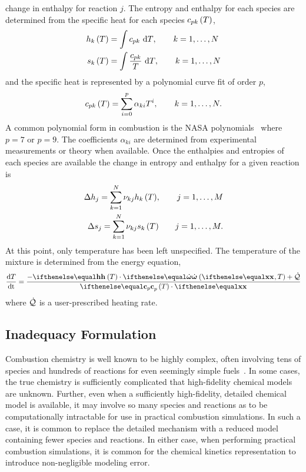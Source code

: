 \documentclass[fontsize=12pt, %
               paper=a4, %
               hyperref]{report}
\begin{document}
  change in enthalpy for reaction $j$.  The entropy and enthalpy 
  for each species are determined from the specific heat for each 
  species $c_{pk}\left(T\right)$,
  \begin{subequations}
    \begin{align}
      h_{k}\left(T\right) &= \int{c_{pk}\ \mathrm{d}T}, \qquad k = 1,\ldots,N \\
      s_{k}\left(T\right) &= \int{\frac{c_{pk}}{T}\ \mathrm{d}T}, \qquad k=1,\ldots,N
    \end{align}
  \end{subequations}
  and the specific heat is represented by a polynomial curve fit of 
  order $p$, 
  \begin{align}
    c_{pk}\left(T\right) = \sum_{i=0}^{p}{\alpha_{ki}T^{i}}, \qquad k = 1,\ldots,N.
  \end{align}
  A common polynomial form in combustion is the NASA
  polynomials~\cite{mcbride1993coefficients} where $p=7$ or $p=9$.  The coefficients 
  $\alpha_{ki}$ are determined from experimental measurements or theory when available.  
  Once the enthalpies and entropies of each species are available the change in entropy 
  and enthalpy for a given reaction is 
  \begin{subequations}
    \begin{align}
      \Delta h_{j} = \sum_{k=1}^{N}{\nu_{kj}h_{k}\left(T\right)}, \qquad j = 1,\ldots,M \\
      \Delta s_{j} = \sum_{k=1}^{N}{\nu_{kj}s_{k}\left(T\right)} \qquad j=1,\ldots,M.
    \end{align}
  \end{subequations} 
  At this point, only temperature has been left unspecified.  The temperature of 
  the mixture is determined from the energy equation,
  \begin{align}
    \odeone{T}{\time} = \dfrac{-\displaystyle\enth\lr{T}\cdot\rr\lr{\xc,T} + \heating}
                              {\displaystyle\cp\lr{T}\cdot\xc} 
    \label{eq:energy}
  \end{align}
  where $\dot{\mathcal{Q}}$ is a user-prescribed heating rate.

    
  \subsection{Inadequacy Formulation} \label{sec:inad1}
  Combustion chemistry is well known to be highly complex, often
  involving tens of species and hundreds of reactions for even seemingly
  simple fuels~\cite{kee2005chemically}.  In some cases, the true
  chemistry is sufficiently complicated that high-fidelity chemical
  models are unknown.  Further, even when a sufficiently high-fidelity,
  detailed chemical model is available, it may involve so many species
  and reactions as to be computationally intractable for use in practical 
  combustion simulations.  In such a case, it is common to replace the 
  detailed mechanism with a reduced model containing fewer species and 
  reactions.  In either case, when performing practical combustion simulations, 
  it is common for the chemical kinetics representation to introduce
  non-negligible modeling error.
  
\end{document}

